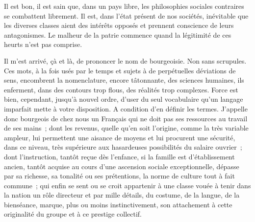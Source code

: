 \documentclass[french,twoside]{book} %
\begin{document}
\noindent Il est bon, il est sain que, dans un pays libre, les philosophies sociales contraires se combattent librement. Il est, dans l’état présent de nos sociétés, inévitable que les diverses classes aient des intérêts opposés et prennent conscience de leurs antagonismes. Le malheur de la patrie commence quand la légitimité de ces heurts n’est pas comprise.\par
Il m’est arrivé, çà et là, de prononcer le nom de bourgeoisie. Non sans scrupules. Ces mots, à la fois usés par le temps et sujets à de perpétuelles déviations de sens, encombrent la nomenclature, encore tâtonnante, des sciences humaines, ils enferment, dans des contours trop flous, des réalités trop complexes. Force est bien, cependant, jusqu’à nouvel ordre, d’user du seul vocabulaire qu’un langage imparfait mette à votre disposition. A condition d’en définir les termes. J’appelle donc bourgeois de chez nous un Français qui ne doit pas ses ressources au travail de ses mains ; dont les revenus, quelle qu’en soit l’origine, comme la très variable ampleur, lui permettent une aisance de moyens et lui procurent une sécurité, dans ce niveau, très supérieure aux hasardeuses possibilités du salaire ouvrier ; dont l’instruction, tantôt reçue dès l’enfance, si la famille est d’établissement ancien, tantôt acquise au cours d’une ascension sociale exceptionnelle, dépasse par sa richesse, sa tonalité ou ses prétentions, la norme   de culture tout à fait commune ; qui enfin se sent ou se croit appartenir à une classe vouée à tenir dans la nation un rôle directeur et par mille détails, du costume, de la langue, de la bienséance, marque, plus ou moins instinctivement, son attachement à cette originalité du groupe et à ce prestige collectif.\par
\end{document}

